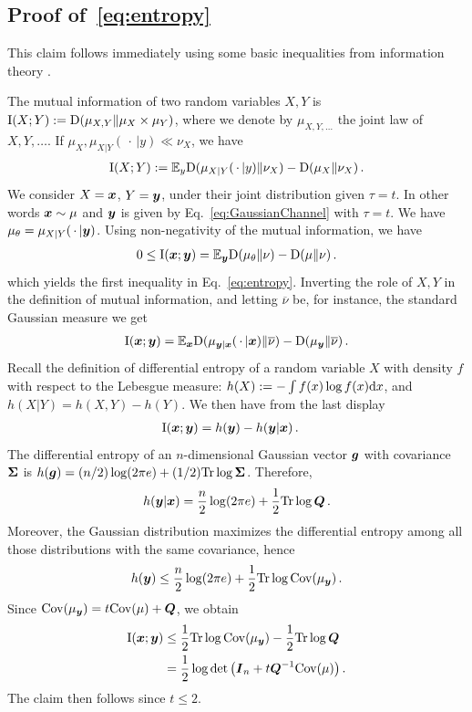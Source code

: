 \documentclass[11pt]{article}
\numberwithin{equation}{section}
\theoremstyle{myremark}
\theoremstyle{myremark}
\theoremstyle{myexample}
\newcommand{\1}{\mathbf{1}}
\begin{document}
\subsection{Proof of~\eqref{eq:entropy}}
This claim follows immediately using some basic inequalities from 
information theory \cite{CoverThomas,dembo1991information}. 

The mutual information of two random variables $X,Y$ is
${\rm I}(X;Y) := {\rm D}(\mu_{X,Y}\|\mu_X\times \mu_Y)$, where we denote by $\mu_{X,Y,\dots}$
the joint law of $X,Y,\dots$. If $\mu_X, \mu_{X|Y}(\, \cdot\, |y)\ll \nu_X$, we have
%
\begin{align}
{\rm I}(X;Y) := {\mathbb E}_{y}{\rm D}(\mu_{X|Y}(\,\cdot\,|y)\|\nu_X)-{\rm D}(\mu_{X}\|\nu_X)\, .
\end{align}
%
We consider $X={\boldsymbol{x}}$, $Y={\boldsymbol{y}}$, under their joint distribution given $\tau=t$. 
In other words ${\boldsymbol{x}}\sim \mu$ and ${\boldsymbol{y}}$ is given by Eq.~\eqref{eq:GaussianChannel} 
with $\tau=t$. We have $\mu_{\theta}=\mu_{X|Y}(\,\cdot\,|{\boldsymbol{y}})$.
Using non-negativity of the mutual information, we have
%
\begin{align}
0\le {\rm I}({\boldsymbol{x}};{\boldsymbol{y}}) = {\mathbb E}_{{\boldsymbol{y}}}{\rm D}(\mu_{\theta}\|\nu)-{\rm D}(\mu\|\nu)\, .
\end{align}
%
which yields the first inequality in Eq.~\eqref{eq:entropy}. Inverting the role of $X,Y$
in the definition of mutual information, and letting $\overline{\nu}$ be, for instance, 
 the standard Gaussian measure we get 
%
\begin{align}
{\rm I}({\boldsymbol{x}};{\boldsymbol{y}}) = {\mathbb E}_{{\boldsymbol{x}}}{\rm D}(\mu_{{\boldsymbol{y}}|{\boldsymbol{x}}}(\,\cdot\,|{\boldsymbol{x}})\|\overline{\nu})-
{\rm D}(\mu_{{\boldsymbol{y}}}\|\overline{\nu})\, .
\end{align}
%
Recall the definition of differential entropy of a random variable $X$ with density $f$ with respect to the Lebesgue
measure: $h(X) :=-\int f(x)\log f(x) {\rm d} x$, and $h(X|Y) = h(X,Y)-h(Y)$. 
We then have from the last display
%
\begin{align}
\info(\bx;\by) &=  h(\by) - h(\by|\bx)\, . %
\end{align}
%
The differential entropy of an $n$-dimensional Gaussian vector ${\boldsymbol{g}}$ with covariance ${\boldsymbol{\Sigma}}$
is $h({\boldsymbol{g}}) = (n/2)\log(2\pi e)+(1/2){\rm Tr}\log {\boldsymbol{\Sigma}}$. Therefore,  
\[h({\boldsymbol{y}}|{\boldsymbol{x}}) =  \frac{n}{2}\log(2\pi e)+ \frac{1}{2}{\rm Tr}\log {\boldsymbol{Q}} \, .\]
Moreover, the Gaussian distribution maximizes the differential entropy among all those distributions with the same covariance, hence
\begin{align} 
h({\boldsymbol{y}}) \le  \frac{n}{2}\log(2\pi e)+ \frac{1}{2}{\rm Tr}\log {\rm Cov}(\mu_{{\boldsymbol{y}}}) \, . 
\end{align}
Since ${\rm Cov}(\mu_{{\boldsymbol{y}}}) = t {\rm Cov}(\mu) + {\boldsymbol{Q}}$, we obtain
%
\begin{align}
{\rm I}({\boldsymbol{x}};{\boldsymbol{y}}) &\le \frac{1}{2}{\rm Tr}\log {\rm Cov}(\mu_{{\boldsymbol{y}}})-  \frac{1}{2}{\rm Tr}\log {\boldsymbol{Q}} \\
&=   \frac{1}{2}\log \det \big( {\boldsymbol{I}}_n + t {\boldsymbol{Q}}^{-1} {\rm Cov}(\mu)\big) \, .
\end{align}
%
The claim then follows since $t \le 2$.
 
\end{document}
